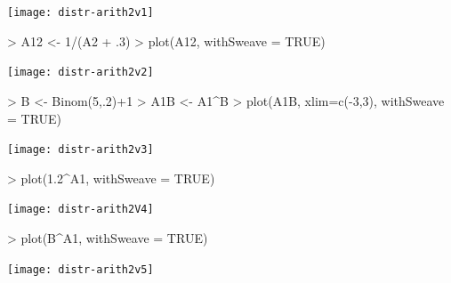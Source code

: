 \documentclass[11pt]{article}
\begin{document}
\begin{Schunk}
\end{Schunk}
\texttt{[image: distr-arith2v1]}
\begin{Schunk}
\begin{Sinput}
>   A12 <- 1/(A2 + .3)
>   plot(A12, withSweave = TRUE)
\end{Sinput}
\end{Schunk}
\texttt{[image: distr-arith2v2]}
\begin{Schunk}
\begin{Sinput}
>   B <- Binom(5,.2)+1
>   A1B <- A1^B
>   plot(A1B, xlim=c(-3,3), withSweave = TRUE)
\end{Sinput}
\end{Schunk}
\texttt{[image: distr-arith2v3]}
\begin{Schunk}
\begin{Sinput}
>   plot(1.2^A1, withSweave = TRUE)
\end{Sinput}
\end{Schunk}
\texttt{[image: distr-arith2V4]}
\begin{Schunk}
\begin{Sinput}
>   plot(B^A1, withSweave = TRUE)
\end{Sinput}
\end{Schunk}
\texttt{[image: distr-arith2v5]}
%

\end{document}
\end{Sinput}
\end{Schunk}
\end{document}
